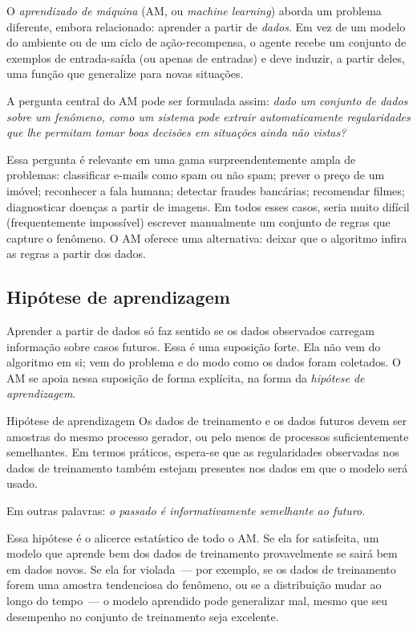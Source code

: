 \documentclass[12pt,a4paper]{article}
\begin{document}
O \emph{aprendizado de máquina} (AM, ou \textit{machine learning}) aborda um problema diferente, embora relacionado: aprender a partir de \emph{dados}. Em vez de um modelo do ambiente ou de um ciclo de ação-recompensa, o agente recebe um conjunto de exemplos de entrada-saída (ou apenas de entradas) e deve induzir, a partir deles, uma função que generalize para novas situações.

A pergunta central do AM pode ser formulada assim: \textit{dado um conjunto de dados sobre um fenômeno, como um sistema pode extrair automaticamente regularidades que lhe permitam tomar boas decisões em situações ainda não vistas?}

Essa pergunta é relevante em uma gama surpreendentemente ampla de problemas: classificar e-mails como spam ou não spam; prever o preço de um imóvel; reconhecer a fala humana; detectar fraudes bancárias; recomendar filmes; diagnosticar doenças a partir de imagens. Em todos esses casos, seria muito difícil (frequentemente impossível) escrever manualmente um conjunto de regras que capture o fenômeno. O AM oferece uma alternativa: deixar que o algoritmo infira as regras a partir dos dados.

\subsection{Hipótese de aprendizagem}

Aprender a partir de dados só faz sentido se os dados observados carregam informação sobre casos futuros. Essa é uma suposição forte. Ela não vem do algoritmo em si; vem do problema e do modo como os dados foram coletados. O AM se apoia nessa suposição de forma explícita, na forma da \emph{hipótese de aprendizagem}.

\begin{notabox}{Hipótese de aprendizagem}
Os dados de treinamento e os dados futuros devem ser amostras do mesmo processo gerador, ou pelo menos de processos suficientemente semelhantes. Em termos práticos, espera-se que as regularidades observadas nos dados de treinamento também estejam presentes nos dados em que o modelo será usado.

Em outras palavras: \emph{o passado é informativamente semelhante ao futuro}.
\end{notabox}

Essa hipótese é o alicerce estatístico de todo o AM. Se ela for satisfeita, um modelo que aprende bem dos dados de treinamento provavelmente se sairá bem em dados novos. Se ela for violada~--- por exemplo, se os dados de treinamento forem uma amostra tendenciosa do fenômeno, ou se a distribuição mudar ao longo do tempo~--- o modelo aprendido pode generalizar mal, mesmo que seu desempenho no conjunto de treinamento seja excelente.
\end{document}
